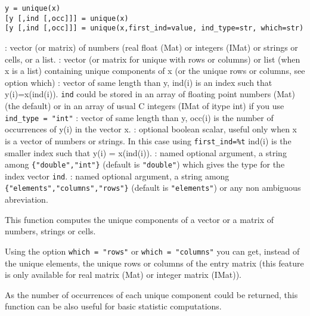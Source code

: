 
\begin{mandesc}
\end{mandesc}

\begin{calling_sequence}
\begin{verbatim}
y = unique(x)
[y [,ind [,occ]]] = unique(x)
[y [,ind [,occ]]] = unique(x,first_ind=value, ind_type=str, which=str)
\end{verbatim}
\end{calling_sequence}
\begin{parameters}
  \begin{varlist}
    : vector (or matrix) of numbers (real float (Mat) or integers (IMat) or strings 
               or cells, or a list.
    : vector (or matrix for unique with rows or columns) or list (when x is a list) containing 
               unique components of x (or the unique rows or columns, see option which)
    : vector of same length than y, ind(i) is an index
                 such that y(i)=x(ind(i)). \verb+ind+ could be stored in an array of
                 floating point numbers (Mat) (the default) or in an array of 
                 usual C integers (IMat of itype int) if you use \verb+ind_type = "int"+
    : vector of same length than y, occ(i) is the number
                 of occurrences of y(i) in the vector x.
    : optional boolean scalar, useful only when x is a vector
    of numbers or strings. In this case using \verb!first_ind=%t! ind(i) is
    the smaller index such that y(i) = x(ind(i)).
    : named optional argument, a string among \verb+{"double","int"}+ (default is \verb+"double"+)
    which gives the type for the index vector  \verb+ind+. 
    : named optional argument, a string among \verb+{"elements","columns","rows"}+ (default is
    \verb+"elements"+) or any non ambiguous abreviation.
  \end{varlist}
\end{parameters}

\begin{mandescription}
  This function computes the unique components of a vector or a matrix of numbers,
  strings or cells.

   Using the option \verb+which = "rows"+ or \verb+which = "columns"+ 
  you can get, instead of the unique elements, the unique rows or columns of the entry 
  matrix (this feature is only available for real matrix (Mat) or integer matrix (IMat)). 
   
   As the number of occurrences of each unique
  component could be returned, this function can be also useful for basic statistic
  computations.
\end{mandescription}


